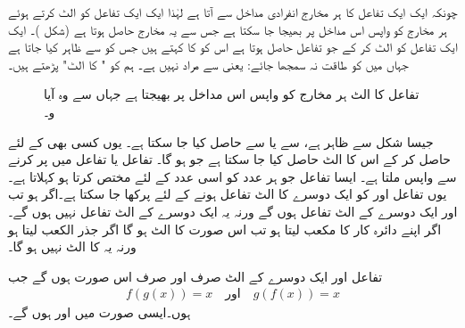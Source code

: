 چونکہ ایک ایک تفاعل کا ہر مخارج  انفرادی مداخل  سے آتا ہے لہٰذا ایک ایک تفاعل کو الٹ کرتے ہوئے ہر مخارج کو واپس اس مداخل پر بھیجا جا سکتا ہے جس سے یہ مخارج حاصل ہوتا ہے (شکل )۔ ایک ایک تفاعل  کو الٹ کر کے جو تفاعل حاصل ہوتا ہے اس کو  کا  کہتے ہیں جس کو  سے ظاہر کیا جاتا ہے جہاں  میں  کو طاقت نہ سمجھا جائے: یعنی  سے مراد  نہیں ہے۔ ہم  کو " کا الٹ" پڑھتے ہیں۔
\begin{figure}
\centering
{}
\caption{
تفاعل  کا الٹ ہر مخارج کو واپس اس مداخل پر بھیجتا ہے جہاں سے وہ آیا و۔
}
\label{شکل_ماورائی_الٹ_واپس_بھیجتا_ہے}
\end{figure}

جیسا شکل  سے ظاہر ہے،  سے  یا  سے  حاصل کیا جا سکتا ہے۔ یوں کسی بھی  کے لئے  حاصل کر کے اس  کا الٹ  حاصل کیا جا سکتا ہے جو  ہو گا۔ تفاعل  یا تفاعل  میں  پر کرنے سے واپس  ملتا ہے۔ ایسا تفاعل جو ہر عدد کو اسی عدد کے لئے مختص کرتا ہو   کہلاتا ہے۔ یوں تفاعل  اور  کو ایک دوسرے  کا الٹ تفاعل ہونے کے لئے پرکھا جا سکتا ہے۔اگر  ہو تب  اور  ایک دوسرے کے الٹ تفاعل ہوں گے ورنہ یہ ایک دوسرے کے الٹ تفاعل نہیں ہوں گے۔ اگر  اپنے دائرہ کار کا مکعب لیتا ہو تب  اس صورت  کا الٹ ہو گا اگر  جذر الکعب لیتا ہو ورنہ یہ  کا الٹ نہیں ہو گا۔

تفاعل  اور  ایک دوسرے کے الٹ صرف اور صرف اس صورت ہوں گے جب
\begin{align*}
f(g(x))=x\quad \text{اور}\quad g(f(x))=x
\end{align*}
ہوں۔ایسی صورت میں  اور  ہوں گے۔

